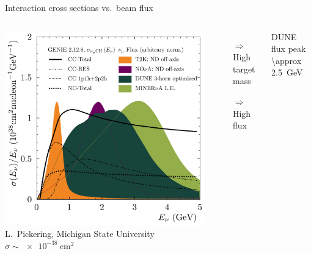 \documentclass[]{beamer}
\newcommand*{\emphcol}{blue}
\newcommand*{\dune}{{DUNE}}
\begin{document}
\begin{frame}{Interaction cross sections vs.\ beam flux}
	\begin{columns}[c]
		\centering
		\includegraphics[width=\textwidth]{nu-detection/flux_and_xsec_from_luke}\\
		{\tiny L.\ Pickering, Michigan State University}
		{\color{\emphcol} $\sigma \sim \SI{e-38}{\centi\metre\squared}$}
		\begin{itemize}
			\item[$\Rightarrow$] High target mass
			\item[$\Rightarrow$] High flux
		\end{itemize}
		{\color{\emphcol} \dune{} flux peak \SI{\approx 2.5}{\giga\electronvolt}}
	\end{columns}
\end{frame}
\end{document}
